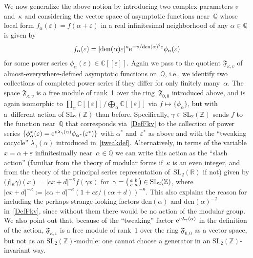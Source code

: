 \documentclass[pdftex]{sigma}
\numberwithin{equation}{section}
\def\l{\lambda}
\def\k{\kappa}
\def\SL{\mathrm{SL}}
\def\a{\alpha}
\def\l{\lambda}
\def\R{\mathbb R}
\def\C{\mathbb C}
\def\Z{\mathbb Z}
\def\Q{\mathbb Q}
\def\a{\alpha}
\def\l{\lambda}
\def\v{\varepsilon}
\def\sma#1#2#3#4{\bigl(\smallmatrix#1&#2\\#3&#4\endsmallmatrix\bigr)} %
\def\den{\mathrm{den}}
\def\be{\begin{equation}}
\def\ee{\end{equation}}
\def\ve{\varepsilon}
\def\g{\gamma}
\def\FF{\mathfrak F}
\begin{document}
We now generalize the above notion by introducing two complex parameters $v$ and~$\k$
and considering the vector space of asymptotic functions near~$\Q$ whose local
form $f_\a(\v)=f(\a+\v)$ in a real infinitesimal neighborhood of any $\a\in\Q$ is
given by
\be
\label{DefFkv}
f_\a(\v) = |\den(\a) \v|^\k {\rm e}^{-v/\den(\a)^2\v} \phi_\a(\v)
\ee
for some power series $\phi_\a(\ve)\in\C[[\v]]$. Again we pass to the quotient
$\FF_{\k,v}$ of almost-everywhere-defined asymptotic functions on~$\Q$, i.e., we
identify two collections of completed power series if they differ for only finitely
many~$\a$. The space $\FF_{\k,v}$ is a free module of rank~1 over the ring~$\FF_{0,0}$
introduced above, and is again isomorphic to $\prod_\a\C[[\v]]/\bigoplus_\a\C[[\v]]$
via $f\mapsto\{\phi_\a\}$, but with a~different action of $\SL_2(\Z)$ than before.
Specifically, $\g\in\SL_2(\Z)$ sends $f$ to the function near~$\Q$ that corresponds
via~\eqref{DefFkv} to the collection of power series
$\{\phi^*_\a(\v)={\rm e}^{v\l_\g(\a)}\phi_{\a^*}(\v^*)\}$ with $\a^*$ and~$\v^*$ as above
and with the ``tweaking cocycle'' $\l_\g(\a)$ introduced in~\eqref{tweakdef}.
Alternatively, in terms of the variable $x=\a+\v$ infinitesimally near~$\a\in\Q$ we
can write this action as the ``slash action'' (familiar from the theory of modular
forms if~$\k$ is an even integer, and from the theory of the principal series
representation of~$\SL_2(\R)$ if not) given by $(f|_\k\g)(x) = |cx+d|^{-\k}f(\g x)$
for~${\g=\sma abcd\in\SL_2(\Z)}$, where $|cx+d|^{-\k}:=|c\a+d|^{-\k}(1+c\v/(c\a+d))^{-\k}$.
This also explains the reason for including the perhaps strange-looking factors
$\den(\a)$ and $\den(\a)^{-2}$ in~\eqref{DefFkv}, since without them there would
be no action of the modular group. We also point out that, because of the ``tweaking''
factor ${\rm e}^{v\l_\g(\a)}$ in the definition of the action, $\FF_{\k,v}$ is a free module
of rank~1 over the ring $\FF_{0,0}$ as a vector space, but not as
an $\SL_2(\Z)$-module: one cannot choose a generator in an $\SL_2(\Z)$-invariant way.
\end{document}
